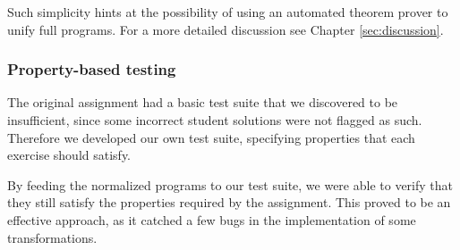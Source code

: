 Such simplicity hints at the possibility of using an automated theorem prover to unify full programs. For a more detailed discussion see Chapter \ref{sec:discussion}.

\subsubsection{Property-based testing}
\label{sec:method-testing}

The original assignment had a basic test suite that we discovered to be insufficient, since some incorrect student solutions were not flagged as such. Therefore we developed our own test suite, specifying properties that each exercise should satisfy.

By feeding the normalized programs to our test suite, we were able to verify that they still satisfy the properties required by the assignment. This proved to be an effective approach, as it catched a few bugs in the implementation of some transformations.
